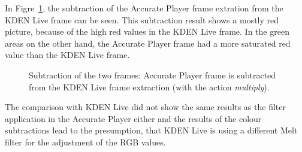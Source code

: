 \documentclass[../MasterThesis.tex]{subfiles}
\begin{document}
In Figre~\ref{figure:multiplygimp}, the subtraction of the Accurate Player frame extration from the KDEN Live frame can be seen. This subtraction result shows a mostly red picture, because of the high red values in the KDEN Live frame. In the green areas on the other hand, the Accurate Player frame had a more saturated red value than the KDEN Live frame.



\begin{figure}[H]
	\begin{center}
		\caption[Subtraction of KDEN Live (\textit{multiply} and Accurate Player).]{Subtraction of the two frames: Accurate Player frame is subtracted from the KDEN Live frame extraction (with the action \textit{multiply}).}
		\label{figure:multiplygimp}
	\end{center}
\end{figure}





The comparison with KDEN Live did not show the same results as the filter application in the Accurate Player either and the results of the colour subtractions lead to the presumption, that KDEN Live is using a different Melt filter for the adjustment of the RGB values.












	
	
	
	
\end{document}
